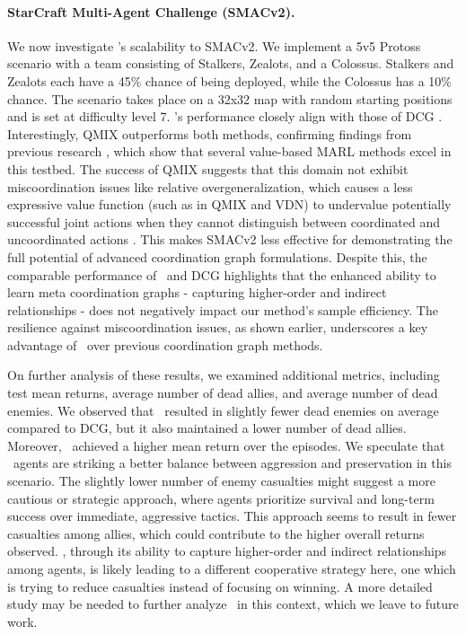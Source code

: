 \paragraph{StarCraft Multi-Agent Challenge (SMACv2).} We now investigate \algoabb's scalability to SMACv2. We implement a 5v5 Protoss scenario with a team consisting of Stalkers, Zealots, and a Colossus. Stalkers and Zealots each have a 45\% chance of being deployed, while the Colossus has a 10\% chance. The scenario takes place on a 32x32 map with random starting positions and is set at difficulty level 7. \algoabb's performance closely align with those of DCG . Interestingly, QMIX outperforms both methods, confirming findings from previous research \cite{yu2022surprising}, which show that several value-based MARL methods excel in this testbed. The success of QMIX suggests that this domain  not exhibit miscoordination issues like relative overgeneralization, which causes a less expressive value function (such as in QMIX and VDN) to undervalue potentially successful joint actions when they cannot distinguish between coordinated and uncoordinated actions \cite{bohmer2020deep,gupta2021uneven}. This makes SMACv2 less effective for demonstrating the full potential of advanced coordination graph formulations. Despite this, the comparable performance of \algoabb\ and DCG highlights that the enhanced ability to learn meta coordination graphs - capturing higher-order and indirect relationships - does not negatively impact our method's sample efficiency. The resilience against miscoordination issues, as shown earlier, underscores a key advantage of \algoabb\ over previous coordination graph methods. 

On further analysis of these results, we examined additional metrics, including test mean returns, average number of dead allies, and average number of dead enemies. We observed that \algoabb\ resulted in slightly fewer dead enemies on average compared to DCG, but it also maintained a lower number of dead allies. Moreover, \algoabb\ achieved a higher mean return over the episodes. We speculate that \algoabb\ agents are striking a better balance between aggression and preservation in this scenario. The slightly lower number of enemy casualties might suggest a more cautious or strategic approach, where agents prioritize survival and long-term success over immediate, aggressive tactics. This approach seems to result in fewer casualties among allies, which could contribute to the higher overall returns observed. \algoabb, through its ability to capture higher-order and indirect relationships among agents, is likely leading to a different cooperative strategy here, one which is trying to reduce casualties instead of focusing on winning. A more detailed study may be needed to further analyze \algoabb\ in this context, which we leave to future work. 

